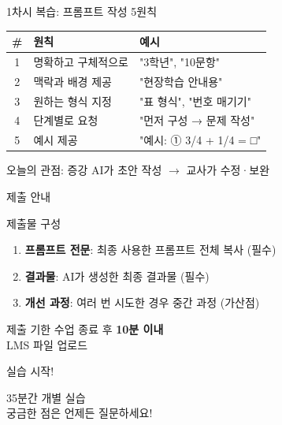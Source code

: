 \documentclass[aspectratio=169, 11pt]{beamer}
\begin{document}
\begin{frame}{1차시 복습: 프롬프트 작성 5원칙}
\begin{center}
\begin{tabular}{|c|l|l|}
\hline
\textbf{\#} & \textbf{원칙} & \textbf{예시} \\
\hline
1 & 명확하고 구체적으로 & "3학년", "10문항" \\
\hline
2 & 맥락과 배경 제공 & "현장학습 안내용" \\
\hline
3 & 원하는 형식 지정 & "표 형식", "번호 매기기" \\
\hline
4 & 단계별로 요청 & "먼저 구성 → 문제 작성" \\
\hline
5 & 예시 제공 & "예시: ① 3/4 + 1/4 = □" \\
\hline
\end{tabular}
\end{center}

\vspace{0.3cm}

\begin{block}{오늘의 관점: 증강}
AI가 초안 작성 $\rightarrow$ 교사가 수정·보완
\end{block}
\end{frame}

\begin{frame}{제출 안내}
\begin{block}{ 제출물 구성}
\begin{enumerate}
  \item \textbf{프롬프트 전문}: 최종 사용한 프롬프트 전체 복사 (필수)
  \item \textbf{결과물}: AI가 생성한 최종 결과물 (필수)
  \item \textbf{개선 과정}: 여러 번 시도한 경우 중간 과정 (가산점)
\end{enumerate}
\end{block}

\vspace{0.3cm}

\begin{alertblock}{ 제출 기한}
\centering
\Large
수업 종료 후 \textbf{10분 이내}\\
LMS 파일 업로드
\end{alertblock}
\end{frame}

\begin{frame}
\begin{center}
\Huge
{} 실습 시작!

\vspace{1cm}

\Large
35분간 개별 실습\\
궁금한 점은 언제든 질문하세요!
\end{center}
\end{frame}
\end{document}

